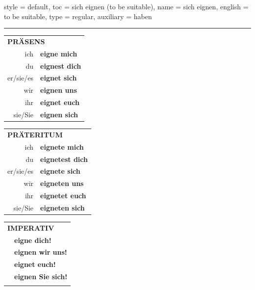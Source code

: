 \begin{verbentry}{
  style = {default},
  toc = {sich eignen (to be suitable)},
  name = {sich eignen},
  english = {to be suitable},
  type = {regular},
  auxiliary = {haben}
}
 
    
     \vspace{5pt}

    \hrule
    
    \vspace{5pt}

  \begin{tabular}{rl}
     \multicolumn{2}{l}{\textbf{PRÄSENS} }\\
    ich & \textbf{eigne mich}\\
    du & \textbf{eignest dich}\\
    er/sie/es & \textbf{eignet sich}\\
    wir & \textbf{eignen uns}\\
    ihr & \textbf{eignet euch}\\
    sie/Sie & \textbf{eignen sich}\\
  \end{tabular}
  \hfill
     \begin{tabular}{rl}
    \multicolumn{2}{l}{\textbf{PRÄTERITUM} }\\
    ich & \textbf{eignete mich}\\
    du & \textbf{eignetest dich}\\
    er/sie/es & \textbf{eignete sich}\\
    wir & \textbf{eigneten uns}\\
    ihr & \textbf{eignetet euch}\\
    sie/Sie & \textbf{eigneten sich}\\
  \end{tabular}
  \hfill
  \begin{tabular}{rl}
     \multicolumn{2}{l}{\textbf{IMPERATIV} }\\
   & \textbf{eigne dich!}\\
   & \textbf{eignen wir uns!}\\
   & \textbf{eignet euch!}\\
   & \textbf{eignen Sie sich!}\\
   & \vspace{10pt}
  \end{tabular}

    \vspace{10pt}


\end{verbentry}
